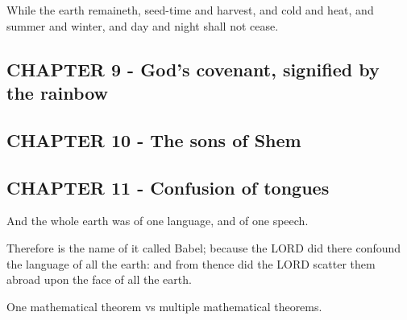 \documentclass{article}
\begin{document}
While the earth remaineth, seed-time and harvest, and cold and heat, and summer and winter, and day and night shall not cease.

\subsection{CHAPTER 9 - God's covenant, signified by the rainbow}
\subsection{CHAPTER 10 - The sons of Shem}
\subsection{CHAPTER 11 - Confusion of tongues}
And the whole earth was of one language, and of one speech.

Therefore is the name of it called Babel; because the LORD did there confound the language of all the earth: and from thence did the LORD scatter them abroad upon the face of all the earth.

One mathematical theorem vs multiple mathematical theorems.

\printbibliography
\end{document}
